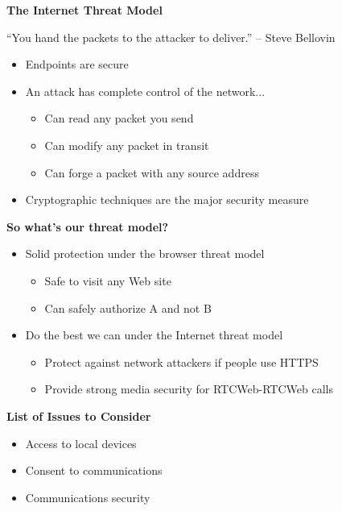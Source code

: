 \documentclass[helvetica]{seminar}
\newcommand{\heading}[1]{%
  \begin{center} 
    \large\bf 
    #1 
  \end{center} 
  \vspace{.4 in}}
\begin{document}
\begin{slide}
\heading{The Internet Threat Model}

``You hand the packets to the attacker to deliver.'' -- Steve Bellovin

\begin{itemize}
\item Endpoints are secure
\item An attack has complete control of the network...
\begin{itemize}
\item Can read any packet you send
\item Can modify any packet in transit
\item Can forge a packet with any source address
\end{itemize}
\item Cryptographic techniques are the major security measure
\end{itemize}
\end{slide}



\begin{slide}
\heading{So what's our threat model?}

\begin{itemize}
\item Solid protection under the browser threat model
  \begin{itemize}
  \item Safe to visit any Web site
  \item Can safely authorize A and not B
  \end{itemize}
\item Do the best we can under the Internet threat model
  \begin{itemize}
  \item Protect against network attackers if people use HTTPS
  \item Provide strong media security for RTCWeb-RTCWeb calls
  \end{itemize}
\end{itemize}
\end{slide}


\begin{slide}
\heading{List of Issues to Consider}

\begin{itemize}
\item Access to local devices
\item Consent to communications
\item Communications security
\end{itemize}
              
\end{slide}
\end{document}
